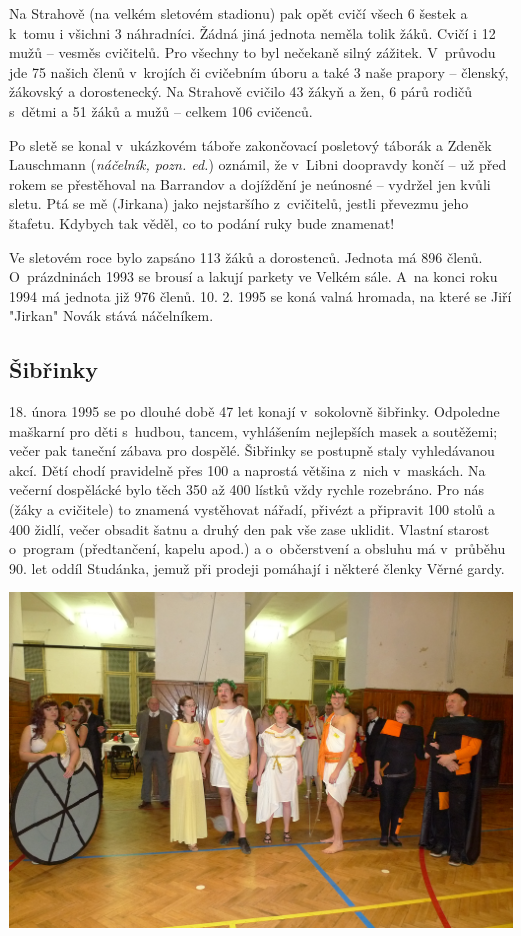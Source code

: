 \documentclass[a5paper, 11pt, twoside]{article}
\begin{document}
Na Strahově (na velkém sletovém stadionu) pak opět cvičí všech 6 šestek
a k~tomu i všichni 3 náhradníci. Žádná jiná jednota neměla tolik žáků.
Cvičí i 12 mužů -- vesměs cvičitelů. Pro všechny to byl nečekaně silný
zážitek. V~průvodu jde 75 našich členů v~krojích či cvičebním úboru a
také 3 naše prapory -- členský, žákovský a dorostenecký. Na Strahově
cvičilo 43 žákyň a žen, 6 párů rodičů s~dětmi a 51 žáků a mužů -- celkem
106 cvičenců.

Po sletě se konal v~ukázkovém táboře zakončovací posletový táborák a
Zdeněk Lauschmann (\textit{náčelník, pozn. ed.}) oznámil, že v~Libni
doopravdy končí -- už před rokem se přestěhoval na Barrandov a dojíždění
je neúnosné -- vydržel jen kvůli sletu. Ptá se mě (Jirkana) jako
nejstaršího z~cvičitelů, jestli převezmu jeho štafetu. Kdybych tak
věděl, co to podání ruky bude znamenat!

Ve sletovém roce bylo zapsáno 113 žáků a dorostenců. Jednota má 896
členů. O~prázdninách 1993 se brousí a lakují parkety ve Velkém sále.
A~na konci roku 1994 má jednota již 976 členů. 10. 2. 1995 se koná valná
hromada, na které se Jiří "Jirkan" Novák stává náčelníkem.

\subsection{Šibřinky}

18. února 1995 se po dlouhé době 47 let konají v~sokolovně šibřinky.
Odpoledne maškarní pro děti s~hudbou, tancem, vyhlášením nejlepších
masek a soutěžemi; večer pak taneční zábava pro dospělé. Šibřinky se
postupně staly vyhledávanou akcí. Dětí chodí pravidelně přes 100 a
naprostá většina z~nich v~maskách. Na večerní dospělácké bylo těch 350
až 400 lístků vždy rychle rozebráno. Pro nás (žáky a cvičitele) to
znamená vystěhovat nářadí, přivézt a připravit 100 stolů a 400 židlí,
večer obsadit šatnu a druhý den pak vše zase uklidit. Vlastní starost
o~program (předtančení, kapelu apod.) a o~občerstvení a obsluhu má
v~průběhu 90. let oddíl Studánka, jemuž při prodeji pomáhají i některé
členky Věrné gardy.

 \includegraphics[width=\textwidth]{img/45_sibrinky.JPG}
\end{document}
